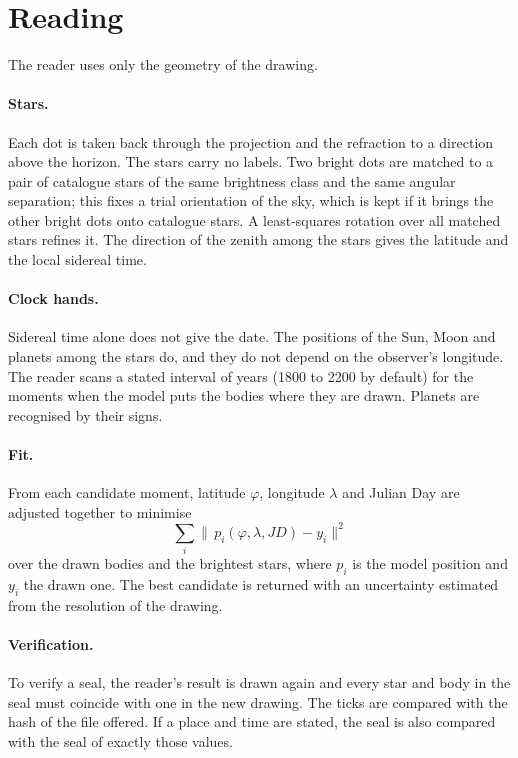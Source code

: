 \documentclass[10pt,twocolumn,a4paper]{article}
\begin{document}
\section{Reading}

The reader uses only the geometry of the drawing.

\paragraph{Stars.} Each dot is taken back through the projection and the
refraction to a direction above the horizon. The stars carry no labels. Two
bright dots are matched to a pair of catalogue stars of the same brightness
class and the same angular separation; this fixes a trial orientation of the
sky, which is kept if it brings the other bright dots onto catalogue stars.
A least-squares rotation over all matched stars refines it. The direction of
the zenith among the stars gives the latitude and the local sidereal time.

\paragraph{Clock hands.} Sidereal time alone does not give the date. The
positions of the Sun, Moon and planets among the stars do, and they do not
depend on the observer's longitude. The reader scans a stated interval of
years (1800 to 2200 by default) for the moments when the model puts the
bodies where they are drawn. Planets are recognised by their signs.

\paragraph{Fit.} From each candidate moment, latitude $\varphi$, longitude
$\lambda$ and Julian Day are adjusted together to minimise
\begin{equation}
\sum_i \big\lVert\, p_i(\varphi,\lambda,\mathit{JD}) - y_i \big\rVert^2
\end{equation}
over the drawn bodies and the brightest stars, where $p_i$ is the model
position and $y_i$ the drawn one. The best candidate is returned with an
uncertainty estimated from the resolution of the drawing.

\paragraph{Verification.} To verify a seal, the reader's result is drawn
again and every star and body in the seal must coincide with one in the new
drawing. The ticks are compared with the hash of the file offered. If a
place and time are stated, the seal is also compared with the seal of
exactly those values.
\end{document}

